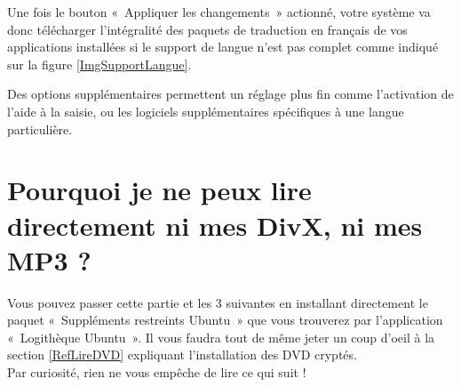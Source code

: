 Une fois le bouton «~Appliquer les changements~» actionné, votre système va donc télécharger l'intégralité des paquets de traduction en français de vos applications installées si le support de langue n'est pas complet comme indiqué sur la figure \ref{ImgSupportLangue}.\par
Des options supplémentaires permettent un réglage plus fin comme l'activation de l'aide à la saisie, ou les logiciels supplémentaires spécifiques à une langue particulière.\par
{}
\section{Pourquoi je ne peux lire directement ni mes DivX, ni mes MP3 ?}
Vous pouvez passer cette partie et les 3 suivantes en installant directement le paquet «~Suppléments restreints Ubuntu~» que vous trouverez par l'application «~Logithèque Ubuntu~». Il vous faudra tout de même jeter un coup d'oeil à la section \ref{RefLireDVD} expliquant l'installation des DVD cryptés.\\
Par curiosité, rien ne vous empêche de lire ce qui suit !
